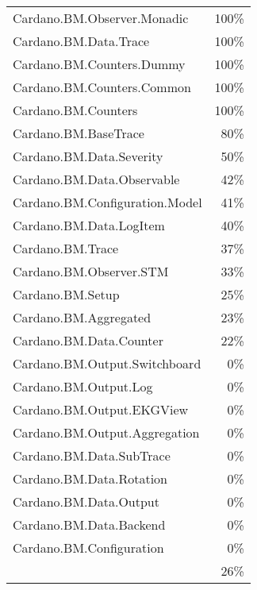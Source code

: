 \begin{tabular}{l r}
   Cardano.BM.Observer.Monadic & 100\% \\
   Cardano.BM.Data.Trace & 100\% \\
   Cardano.BM.Counters.Dummy & 100\% \\
   Cardano.BM.Counters.Common & 100\% \\
   Cardano.BM.Counters & 100\% \\
   Cardano.BM.BaseTrace & 80\% \\
   Cardano.BM.Data.Severity & 50\% \\
   Cardano.BM.Data.Observable & 42\% \\
   Cardano.BM.Configuration.Model & 41\% \\
   Cardano.BM.Data.LogItem & 40\% \\
   Cardano.BM.Trace & 37\% \\
   Cardano.BM.Observer.STM & 33\% \\
   Cardano.BM.Setup & 25\% \\
   Cardano.BM.Aggregated & 23\% \\
   Cardano.BM.Data.Counter & 22\% \\
   Cardano.BM.Output.Switchboard & 0\% \\
   Cardano.BM.Output.Log & 0\% \\
   Cardano.BM.Output.EKGView & 0\% \\
   Cardano.BM.Output.Aggregation & 0\% \\
   Cardano.BM.Data.SubTrace & 0\% \\
   Cardano.BM.Data.Rotation & 0\% \\
   Cardano.BM.Data.Output & 0\% \\
   Cardano.BM.Data.Backend & 0\% \\
   Cardano.BM.Configuration & 0\% \\
    & 26\% \\
\end{tabular}

